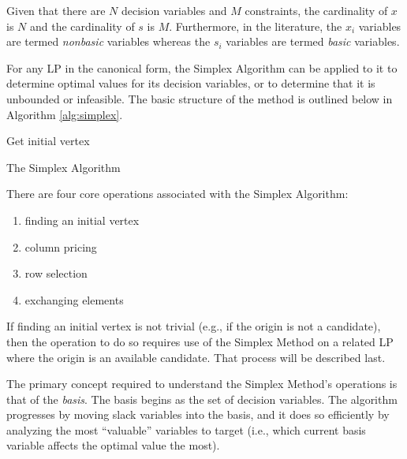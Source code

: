 Given that there are $N$ decision variables and $M$ constraints, the cardinality
of $x$ is $N$ and the cardinality of $s$ is $M$. Furthermore, in the literature,
the $x_i$ variables are termed \textit{nonbasic} variables whereas the $s_i$
variables are termed \textit{basic} variables.

For any LP in the canonical form, the Simplex Algorithm can be applied to it to
determine optimal values for its decision variables, or to determine that it is
unbounded or infeasible. The basic structure of the method is outlined below in
Algorithm \ref{alg:simplex}.

\begin{algorithm}[h!]
 \SetAlgoLined
 Get initial vertex\;
  \caption{The Simplex Algorithm}\label{alg:simplex}
\end{algorithm}

There are four core operations associated with the Simplex Algorithm:
\begin{enumerate}
  \item finding an initial vertex
  \item column pricing
  \item row selection
  \item exchanging elements
\end{enumerate}

If finding an initial vertex is not trivial (e.g., if the origin is not a
candidate), then the operation to do so requires use of the Simplex Method on a
related LP where the origin is an available candidate. That process will be
described last.

The primary concept required to understand the Simplex Method's operations is
that of the \textit{basis}. The basis begins as the set of decision
variables. The algorithm progresses by moving slack variables into the basis,
and it does so efficiently by analyzing the most ``valuable'' variables to
target (i.e., which current basis variable affects the optimal value the most).

